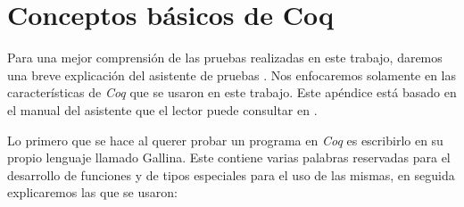 \appendix
\chapter{Conceptos básicos de {\sc Coq}}

Para una mejor comprensi\'on de las pruebas realizadas en este trabajo, daremos una breve explicación
del asistente de pruebas {\coq}. Nos enfocaremos solamente en las características de \textit{Coq} que se usaron en este trabajo. Este apéndice está basado en el manual del asistente que el lector puede consultar en \cite{coqdefs}.

Lo primero que se hace al querer probar un programa en \textit{Coq} es escribirlo en su propio lenguaje llamado Gallina. Este
contiene varias palabras reservadas para el desarrollo de funciones y de tipos especiales para el uso
de las mismas, en seguida explicaremos las que se usaron:

